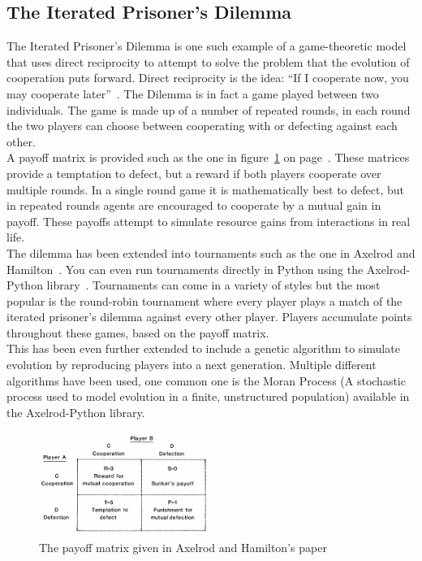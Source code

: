 \documentclass[twoside,twocolumn]{article}
\begin{document}
\subsection{The Iterated Prisoner's Dilemma}
The Iterated Prisoner's Dilemma is one such example of a game-theoretic model that uses direct reciprocity to attempt to solve the problem that the evolution of cooperation puts forward. Direct reciprocity is the idea: ``If I cooperate now, you may cooperate later''~\cite{five_rules_coop}. The Dilemma is in fact a game played between two individuals. The game is made up of a number of repeated rounds, in each round the two players can choose between cooperating with or defecting against each other.\\
A payoff matrix is provided such as the one in figure~\ref{fig:payoffmatrix} on page~\pageref{fig:payoffmatrix}. These matrices provide a temptation to defect, but a reward if both players cooperate over multiple rounds. In a single round game it is mathematically best to defect, but in repeated rounds agents are encouraged to cooperate by a mutual gain in payoff. These payoffs attempt to simulate resource gains from interactions in real life.\\
The dilemma has been extended into tournaments such as the one in Axelrod and Hamilton~\cite{evolution_of_cooperation}. You can even run tournaments directly in Python using the Axelrod-Python library~\cite{axelrodproject}. Tournaments can come in a variety of styles but the most popular is the round-robin tournament where every player plays a match of the iterated prisoner's dilemma against every other player. Players accumulate points throughout these games, based on the payoff matrix.\\
This has been even further extended to include a genetic algorithm to simulate evolution by reproducing players into a next generation. Multiple different algorithms have been used, one common one is the Moran Process (A stochastic process used to model evolution in a finite, unstructured population) available in the Axelrod-Python library. 
\begin{figure}
	\includegraphics[width=0.5\textwidth]{payoffmatrix.png}
	\caption{The payoff matrix given in Axelrod and Hamilton's paper~\cite{evolution_of_cooperation}}
	\label{fig:payoffmatrix}
\end{figure}
\end{document}
